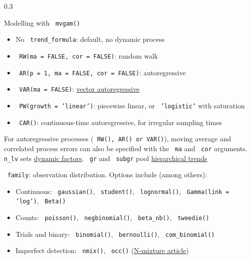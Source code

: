 \documentclass[final,9pt,fleqn]{beamer}\usepackage[]{graphicx}\usepackage[]{xcolor}
\begin{document}
\begin{frame}[fragile]
\begin{columns}
\begin{column}{0.3\paperwidth}
\begin{block}{{\fontsize{21}{21} \selectfont \color{BrickRed} Modelling with \texttt{\color{Orchid} mvgam()}}}
\begin{itemize}
\item No \texttt{\color{Orchid} trend\_formula}: default, no dynamic process

\item\texttt{\color{Orchid} RW(ma = FALSE, cor = FALSE)}: random walk

\item\texttt{\color{Orchid} AR(p = 1, ma = FALSE, cor = FALSE)}: autoregressive

\item\texttt{\color{Orchid} VAR(ma = FALSE)}: \href{https://nicholasjclark.github.io/mvgam/articles/var.html}{vector autoregressive}

\item\texttt{\color{Orchid} PW(growth = 'linear')}: piecewise linear, or \texttt{\color{Orchid} 'logistic'} with saturation

\item\texttt{\color{Orchid} CAR()}: continuous-time autoregressive, for irregular sampling times
\end{itemize}
For autoregressive processes (\texttt{\color{Orchid} RW(), AR() or VAR()}), moving average and correlated process errors can also be specified with the \texttt{\color{Orchid} ma} and \texttt{\color{Orchid} cor} arguments. \texttt{\color{Orchid} n\_lv} sets \href{https://nicholasjclark.github.io/mvgam/articles/dfm.html}{dynamic factors}. \texttt{\color{Orchid} gr} and \texttt{\color{Orchid} subgr} pool \href{https://nicholasjclark.github.io/mvgam/articles/hierarchical_var.html}{hierarchical trends}

\medskip
\texttt{\color{Orchid} family}: observation distribution. Options include (among others):
\begin{itemize}

\item Continuous: \texttt{\color{Orchid} gaussian()}, \texttt{\color{Orchid} student()}, \texttt{\color{Orchid} lognormal()}, \texttt{\color{Orchid} Gamma(link = 'log')}, \texttt{\color{Orchid} Beta()}

\item Counts: \texttt{\color{Orchid} poisson()}, \texttt{\color{Orchid} negbinomial()}, \texttt{\color{Orchid} beta\_nb()}, \texttt{\color{Orchid} tweedie()}

\item Trials and binary: \texttt{\color{Orchid} binomial()}, \texttt{\color{Orchid} bernoulli()}, \texttt{\color{Orchid} com\_binomial()}

\item Imperfect detection: \texttt{\color{Orchid} nmix()}, \texttt{\color{Orchid} occ()} (\href{https://nicholasjclark.github.io/mvgam/articles/nmix.html}{N-mixture article})


\end{itemize}
\end{block}
\end{column}
\end{columns}
\end{frame}
\end{document}
